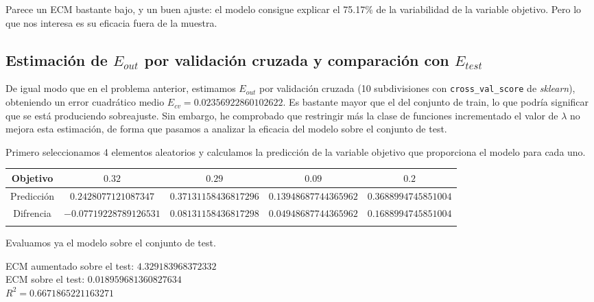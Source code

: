 \documentclass[a4]{article}
\begin{document}
Parece un ECM bastante bajo, y un buen ajuste: el modelo consigue
explicar el 75.17\% de la variabilidad de la variable objetivo. Pero
lo que nos interesa es su eficacia fuera de la muestra.


\subsection{Estimación de $E_{out}$ por validación cruzada y
  comparación con $E_{test}$}

De igual modo que en el problema anterior, estimamos $E_{out}$ por
validación cruzada (10 subdivisiones con \texttt{cross\_val\_score} de
\textit{sklearn}), obteniendo un error cuadrático medio
$E_{cv} = 0.02356922860102622$. Es bastante mayor que el del conjunto
de train, lo que podría significar que se está produciendo
sobreajuste. Sin embargo, he comprobado que restringir más la clase de
funciones incrementado el valor de $\lambda$ no mejora esta
estimación, de forma que pasamos a analizar la eficacia del modelo
sobre el conjunto de test.

Primero seleccionamos 4 elementos aleatorios y calculamos la
predicción de la variable objetivo que proporciona el modelo para cada
uno.

\begin{table}[H]
\begin{tabular}{ccccc} \hline \multicolumn{1}{|c|}{Objetivo} &
\multicolumn{1}{c|}{$0.32$} & \multicolumn{1}{c|}{$0.29$} &
\multicolumn{1}{c|}{$0.09$} & \multicolumn{1}{c|}{$0.2$} \\ \hline
\multicolumn{1}{|c|}{Predicción} &
\multicolumn{1}{c|}{$0.2428077121087347$} &
\multicolumn{1}{c|}{$0.37131158436817296$} &
\multicolumn{1}{c|}{$0.13948687744365962$} &
\multicolumn{1}{c|}{$0.3688994745851004$} \\ \hline
\multicolumn{1}{|c|}{Difrencia} &
\multicolumn{1}{c|}{$-0.07719228789126531$} &
\multicolumn{1}{c|}{$0.08131158436817298$} &
\multicolumn{1}{c|}{$0.04948687744365962$} &
\multicolumn{1}{c|}{$0.1688994745851004$} \\ \hline
\multicolumn{1}{l}{} & \multicolumn{1}{l}{} & \multicolumn{1}{l}{} &
\multicolumn{1}{l}{} & \multicolumn{1}{l}{}
\end{tabular}
\end{table}

\vspace{-10mm}

Evaluamos ya el modelo sobre el conjunto de test.

ECM aumentado sobre el test: $4.329183968372332$ \\
ECM sobre el test: $0.018959681360827634$ \\
$R^2= 0.6671865221163271$
\end{document}
